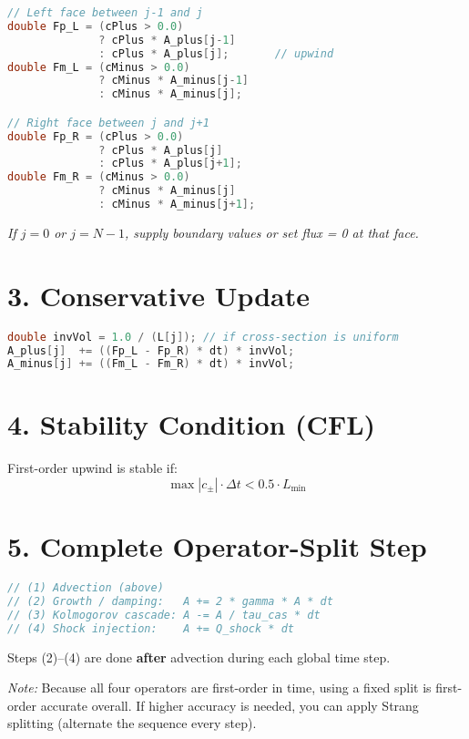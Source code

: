 \begin{lstlisting}[language=C++,basicstyle=\ttfamily\footnotesize]
// Left face between j-1 and j
double Fp_L = (cPlus > 0.0)
              ? cPlus * A_plus[j-1]
              : cPlus * A_plus[j];       // upwind
double Fm_L = (cMinus > 0.0)
              ? cMinus * A_minus[j-1]
              : cMinus * A_minus[j];

// Right face between j and j+1
double Fp_R = (cPlus > 0.0)
              ? cPlus * A_plus[j]
              : cPlus * A_plus[j+1];
double Fm_R = (cMinus > 0.0)
              ? cMinus * A_minus[j]
              : cMinus * A_minus[j+1];
\end{lstlisting}

\emph{If $j = 0$ or $j = N-1$, supply boundary values or set flux = 0 at that face.}

\section*{3. Conservative Update}

\begin{lstlisting}[language=C++,basicstyle=\ttfamily\footnotesize]
double invVol = 1.0 / (L[j]); // if cross-section is uniform
A_plus[j]  += ((Fp_L - Fp_R) * dt) * invVol;
A_minus[j] += ((Fm_L - Fm_R) * dt) * invVol;
\end{lstlisting}

\section*{4. Stability Condition (CFL)}

First-order upwind is stable if:
\[
\max |c_\pm| \cdot \Delta t < 0.5 \cdot L_{\min}
\]

\section*{5. Complete Operator-Split Step}

\begin{lstlisting}[language=C++,basicstyle=\ttfamily\footnotesize]
// (1) Advection (above)
// (2) Growth / damping:   A += 2 * gamma * A * dt
// (3) Kolmogorov cascade: A -= A / tau_cas * dt
// (4) Shock injection:    A += Q_shock * dt
\end{lstlisting}

Steps (2)–(4) are done \textbf{after} advection during each global time step.

\emph{Note:} Because all four operators are first-order in time, using a fixed split is first-order accurate overall. If higher accuracy is needed, you can apply Strang splitting (alternate the sequence every step).

